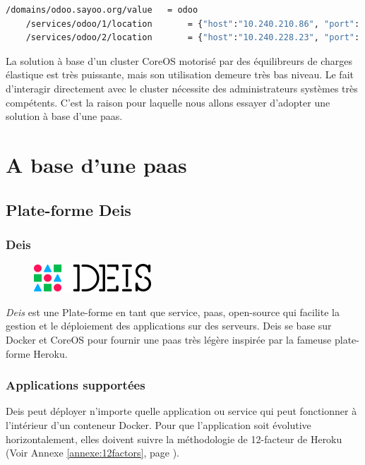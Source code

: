 \begin{onehalfspace}
\begin{lstlisting}[language=bash,caption=Contenu de la base de donnée Etcd]
	/domains/odoo.sayoo.org/value 	= odoo
	/services/odoo/1/location		= {"host":"10.240.210.86", "port": 42654}
	/services/odoo/2/location		= {"host":"10.240.228.23", "port": 42669}
\end{lstlisting}


La solution à base d'un cluster CoreOS motorisé par des équilibreurs de charges élastique est très puissante, mais son utilisation demeure très bas niveau. Le fait d’interagir directement avec le cluster nécessite des administrateurs systèmes très compétents. C'est la raison pour laquelle nous allons essayer d'adopter une solution à base d'une \acrshort{paas}.


\section{A base d'une \acrshort{paas}}

\subsection{Plate-forme Deis}

\subsubsection*{Deis}

\begin{figure}
\centering
\includegraphics[scale=0.4]{chapitre5/assets/deis}
\end{figure}
\noindent \emph{Deis} est une Plate-forme en tant que service, \acrshort{paas}, open-source qui facilite la gestion et le déploiement des applications sur des serveurs. Deis se base sur Docker et CoreOS pour fournir une \acrshort{paas} très légère inspirée par la fameuse plate-forme Heroku.


\subsubsection*{Applications supportées}

Deis peut déployer n'importe quelle application ou service qui peut fonctionner à l'intérieur d'un conteneur Docker. Pour que l'application soit évolutive horizontalement, elles doivent suivre la méthodologie de 12-facteur de Heroku (Voir Annexe \ref{annexe:12factors}, page \pageref{annexe:12factors}).


\end{onehalfspace}
